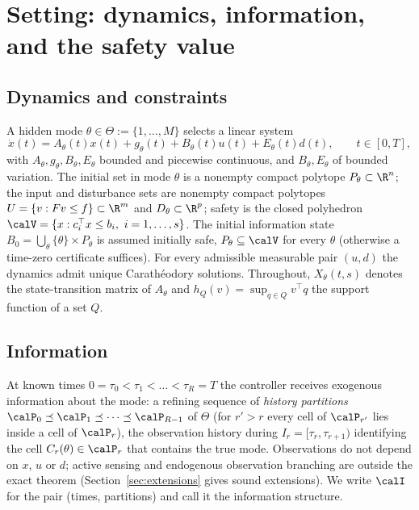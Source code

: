\section{Setting: dynamics, information, and the safety value}\label{sec:setting}

\subsection{Dynamics and constraints}

A hidden mode $\theta\in\Theta:=\{1,\dots,M\}$ selects a linear system
\begin{equation}\label{eq:dyn}
\dot x(t)=A_\theta(t)x(t)+g_\theta(t)+B_\theta(t)u(t)+E_\theta(t)d(t),\qquad t\in[0,T],
\end{equation}
with $A_\theta,g_\theta,B_\theta,E_\theta$ bounded and piecewise continuous, and $B_\theta,E_\theta$ of bounded variation. The initial set in mode $\theta$ is a nonempty compact polytope $P_\theta\subset\R^n$; the input and disturbance sets are nonempty compact polytopes $U=\{v:Fv\le f\}\subset\R^m$ and $D_\theta\subset\R^p$; safety is the closed polyhedron $\calV=\{x:c_i^\top x\le b_i,\ i=1,\dots,s\}$. The initial information state $B_0=\bigcup_\theta\{\theta\}\times P_\theta$ is assumed initially safe, $P_\theta\subseteq\calV$ for every $\theta$ (otherwise a time-zero certificate suffices). For every admissible measurable pair $(u,d)$ the dynamics admit unique Carath\'eodory solutions. Throughout, $X_\theta(t,s)$ denotes the state-transition matrix of $A_\theta$ and $h_Q(v)=\sup_{q\in Q}v^\top q$ the support function of a set $Q$.

\subsection{Information}

At known times $0=\tau_0<\tau_1<\dots<\tau_R=T$ the controller receives exogenous information about the mode: a refining sequence of \emph{history partitions} $\calP_0\preceq\calP_1\preceq\dots\preceq\calP_{R-1}$ of $\Theta$ (for $r'>r$ every cell of $\calP_{r'}$ lies inside a cell of $\calP_r$), the observation history during $I_r=[\tau_r,\tau_{r+1})$ identifying the cell $C_r(\theta)\in\calP_r$ that contains the true mode. Observations do not depend on $x$, $u$ or $d$; active sensing and endogenous observation branching are outside the exact theorem (Section~\ref{sec:extensions} gives sound extensions). We write $\calI$ for the pair (times, partitions) and call it the information structure.

